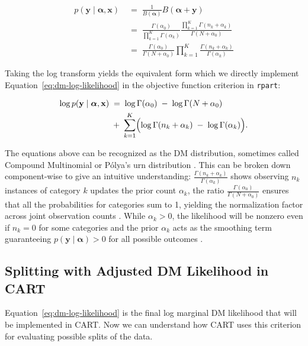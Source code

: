 \begin{equation}
    \begin{aligned}
    \label{eq:dm-likelihood}
    p(\mathbf{y} \mid  \boldsymbol{\alpha}, \mathbf{x}) 
    \;&=\;
    \frac{1}{B(\boldsymbol{\alpha})}B(\boldsymbol{\alpha} + \mathbf{y}) \\
    \;&=\;
    \frac{\Gamma(\alpha_0)}{\prod_{k=1}^K \Gamma(\alpha_k)}
    \frac{\prod_{k=1}^K \Gamma(n_k + \alpha_k)}{\Gamma(N + \alpha_0)} \\
    \;&=\;
    \frac{\Gamma(\alpha_0)}{\Gamma(N + \alpha_0)}
    \prod_{k=1}^K  \frac{\Gamma(n_k + \alpha_k)}{\Gamma(\alpha_k)}
    \end{aligned}
\end{equation}

Taking the log transform yields the equivalent form which we directly implement Equation~\ref{eq:dm-log-likelihood} in the objective function criterion in \texttt{rpart}: 

\begin{equation}
    \begin{aligned}
    \label{eq:dm-log-likelihood}
    \log p(\mathbf{y}\mid \boldsymbol{\alpha}, \mathbf{x})
    \;&=\;
    \log \Gamma(\alpha_0)
    \;-\;
    \log \Gamma(N + \alpha_0)\\
    \;&+\;
    \sum_{k=1}^K \Bigl(\log \Gamma(n_k + \alpha_k) \;-\; \log \Gamma(\alpha_k)
    \Bigr).
    \end{aligned}
\end{equation}

The equations above can be recognized as the DM distribution, sometimes called Compound Multinomial or Pólya's urn distribution \parencite{mimno_polya}. This can be broken down component-wise to give an intuitive understanding: \( \frac{\Gamma(n_k + \alpha_k)}{\Gamma(\alpha_k)}\) shows observing \(n_k\) instances of category \(k\) updates the prior count \(\alpha_k\), the ratio \(\frac{\Gamma(\alpha_0)}{\Gamma(N + \alpha_0)}\) ensures that all the probabilities for categories sum to 1, yielding the normalization factor across joint observation counts \parencite{gundersen2020dirichlet-multinomial, wiki:dirichlet-multinomial}. While \(\alpha_k > 0\), the likelihood will be nonzero even if \(n_k = 0\) for some categories and the prior \(\alpha_k\) acts as the smoothing term guaranteeing \(p(\mathbf{y} \mid \boldsymbol{\alpha}) > 0\) for all possible outcomes \parencite{mimno_polya}. 

\subsection{Splitting with Adjusted DM Likelihood in CART}
\label{sec:ch3-splits-in-cart}
Equation~\ref{eq:dm-log-likelihood} is the final log marginal DM likelihood that will be implemented in CART. Now we can understand how CART uses this criterion for evaluating possible splits of the data. 

